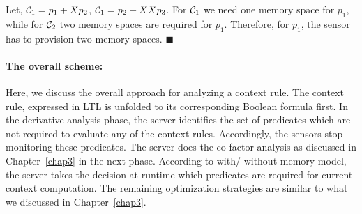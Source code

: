 \begin{example}
Let, ${\cal{C}}_1 = p_1 + Xp_2$, ${\cal{C}}_1 = p_2 + XXp_3$. For ${\cal{C}}_1$ we need one memory space for $p_1$,
while for ${\cal{C}}_2$ two memory spaces are required for $p_1$. Therefore, for $p_1$, the sensor has to provision two memory spaces.
 \hfill$\blacksquare$
\end{example}

\begin{comment}
\noindent
Now we formally propose an algorithm to find the memory requirement of each predicate defined in the server.
\begin{algorithm}
  \caption{MemoryRequirementAnalysis}
  \begin{algorithmic}[1]
  \State {Input:  ${\cal{P}}=\{p_1,p_2,\ldots,p_m\}, {\hat{\cal{C}}}=\{{\cal{C}}_1,{\cal{C}}_2,\ldots,{\cal{C}}_k\}$}
  \State {Output: ${\cal{M}}_1, {\cal{M}}_2,\ldots, {\cal{M}}_m$}\\
  \Comment{\emph{Memory space is required by each predicate}}
  \State Initialize ${\cal{M}}_1, {\cal{M}}_2,\ldots, {\cal{M}}_m$ by 0.
  \For{$c \in {\hat{\cal{C}}}$}
    \For{$p_i \in {\cal{P}}$}
      \State Calculate time instant $(d_1)$, at which $p_i$ is required to compute $c$ for the first time.    
      \If{Temporal Depth of $c -d_1 >   {\cal{M}}_i$} 
	\State ${\cal{M}}_i =$ Temporal Depth of $c -d_1$ 
      \EndIf
    \EndFor
  \EndFor
 \end{algorithmic}
 \label{algo1}
\end{algorithm}
\end{comment}

\noindent
\paragraph*{The overall scheme: }

\noindent
Here, we discuss the overall approach for analyzing a context rule. The context rule, expressed in LTL is unfolded
to its corresponding Boolean formula first.
In the derivative analysis phase, the server identifies the set of predicates which are not required to evaluate any of the context rules.
Accordingly, the sensors stop monitoring these predicates.
The server does the co-factor analysis as discussed in Chapter~\ref{chap3} in the next phase. 
According to with/ without memory model,
the server takes the decision at runtime which predicates are required for current context computation.
The remaining optimization strategies are similar to what we discussed in Chapter~\ref{chap3}.




